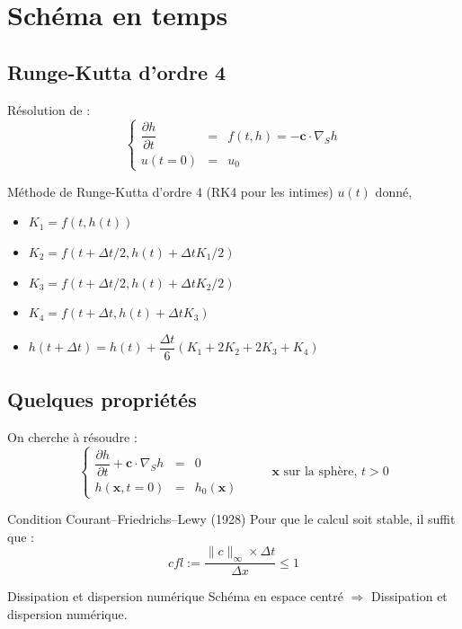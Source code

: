 \documentclass[11pt]{beamer}
\begin{document}
\section{Schéma en temps}
\subsection{Runge-Kutta d'ordre 4}
\begin{frame}
\begin{block}{}
Résolution de :
$$\left\{
\begin{array}{rcl}
\dfrac{\partial h}{\partial t} & = & f(t,h) = - \mathbf{c} \cdot \nabla_S h\\
u(t=0) & = & u_0
\end{array}
\right.$$
\end{block}

\pause
\begin{block}{Méthode de Runge-Kutta d'ordre 4 (RK4 pour les intimes)}
$u(t)$ donné, 
\begin{itemize}
\item $K_1 = f(t, h(t))$
\item $K_2 = f(t+\Delta t/2, h(t)+\Delta t K_1 /2)$
\item $K_3 = f(t+\Delta t/2, h(t)+\Delta t K_2 /2)$
\item $K_4 = f(t+\Delta t, h(t)+\Delta t K_3)$
\item $h(t+\Delta t) = h(t)+\dfrac{\Delta t}{6}\left( K_1 + 2 K_2 + 2 K_3 + K_4\right)$
\end{itemize}
\end{block}
\end{frame}

\subsection{Quelques propriétés}
\begin{frame}
On cherche à résoudre :
$$\left\{
\begin{array}{rcl}
\dfrac{\partial h}{\partial t} + \mathbf{c} \cdot \nabla_S h & = & 0 \\
h(\mathbf{x},t=0) & = & h_0 ( \mathbf{x} )
\end{array}
\right. \hspace{1cm} \mathbf{x} \text{ sur la sphère, } t>0$$

\pause
\begin{block}{Condition Courant–Friedrichs–Lewy (1928)}
Pour que le calcul soit stable, il suffit que :
$$cfl := \dfrac{\|c\|_{\infty} \times \Delta t}{\Delta x} \leq 1$$
\end{block}

\pause
\begin{block}{Dissipation et dispersion numérique}
Schéma en espace centré $\Rightarrow$ Dissipation et dispersion numérique.
\end{block}
\end{frame}
\end{document}
